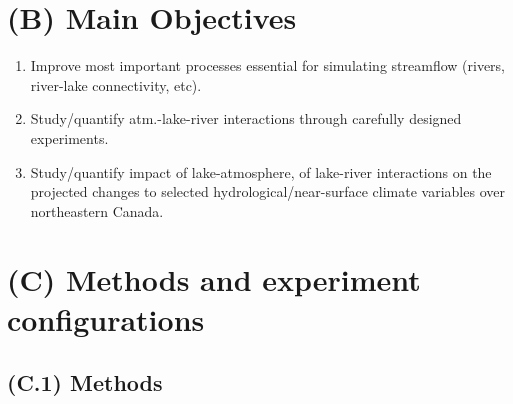 \documentclass[a0,landscape]{a0poster}
\begin{document}
\begin{multicols*}{3}

\color{DarkSlateGray} %

\section*{(B) Main Objectives}

\begin{enumerate}
\item Improve most important processes essential for simulating streamflow (rivers, river-lake connectivity, etc).
\item Study/quantify atm.-lake-river interactions through carefully designed experiments.
\item Study/quantify impact of lake-atmosphere, of lake-river interactions on the projected changes to selected hydrological/near-surface climate variables over northeastern Canada.
\end{enumerate}


\section*{(C) Methods and experiment configurations}

\subsection*{(C.1) Methods}



\end{multicols*}
\end{document}
